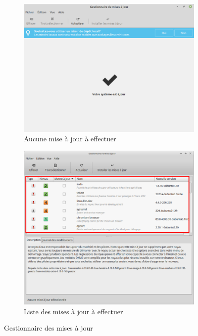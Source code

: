 \documentclass[12pt]{book}
\begin{document}
\begin{enumerate}
\begin{figure}[h]
\begin{subfigure}{.5\textwidth}
						\includegraphics[width=\textwidth]{include/maj_ajour.png}
						\caption{Aucune mise à jour à effectuer}
						\label{fig:maj_ajour}
					\end{subfigure}
					\begin{subfigure}{.5\textwidth}
						\centering
						\includegraphics[width=\textwidth]{include/maj_afaire.png}
						\caption{Liste des mises à jour à effectuer}
						\label{fig:maj_afaire}
					\end{subfigure}
					\caption{Gestionnaire des mises à jour}
					\label{fig:maj}

\end{figure}
\end{enumerate}
\end{document}
